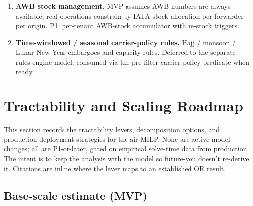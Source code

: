 \documentclass[11pt,a4paper]{article}
\theoremstyle{definition}
\begin{document}
\begin{enumerate}
  \textbf{Catalog-time validation.} At each rate-family registration
  (a tenant adds an offer to the supply catalog), the system computes
  $\partial \text{cost}^{\text{MAWB}}_{a,g} / \partial \text{CW}_{a,g}$
  (and the analogous partials on $\text{Wt}$, $\text{Wv}$,
  $\text{pivot}$, $\text{over}$, $\tau$, $\text{pen}$). If any partial is
  negative, the registration is rejected (or auto-promotes the rate
  family's MAWB-arc binary $z_{a,g}$ to use Equality-mode CW
  linearization) before the offer ever enters a solve. This shifts the
  invariant from a post-solve assertion to a pre-solve guarantee.
  Implementation lives in the supply-catalog data-layer
  (\texttt{data\_model.md}); the LaTeX continues to default to
  Inequality mode under the catalog-time guarantee.
  \item \label{item:awb-stock-management} \textbf{AWB stock management.}
        MVP assumes AWB numbers are always available; real operations
        constrain by IATA stock allocation per forwarder per origin. P1:
        per-tenant AWB-stock accumulator with re-stock triggers.
  \item \label{item:time-windowed-carrier-rules} \textbf{Time-windowed /
        seasonal carrier-policy rules.} Hajj / monsoon / Lunar New Year
        embargoes and capacity rules. Deferred to the separate rules-engine
        model; consumed via the pre-filter carrier-policy predicate when
        ready.
\end{enumerate}

\section{Tractability and Scaling Roadmap}
\label{sec:scaling-roadmap}

This section records the tractability levers, decomposition options, and
production-deployment strategies for the air MILP. None are active model
changes; all are P1-or-later, gated on empirical solve-time data from
production. The intent is to keep the analysis with the model so future-you
doesn't re-derive it. Citations are inline where the lever maps to an
established OR result.

\subsection*{Base-scale estimate (MVP)}
\end{document}
